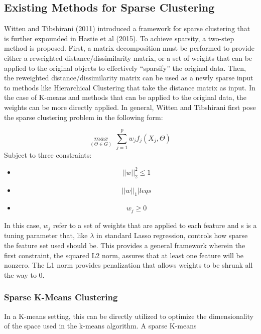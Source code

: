 \documentclass[
]{article}
\providecommand{\tightlist}{%
  \setlength{\itemsep}{0pt}\setlength{\parskip}{0pt}}
\begin{document}
\hypertarget{existing-methods-for-sparse-clustering}{%
\subsection{Existing Methods for Sparse
Clustering}\label{existing-methods-for-sparse-clustering}}

Witten and Tibshirani (2011) introduced a framework for sparse
clustering that is further expounded in Hastie et al (2015). To achieve
sparsity, a two-step method is proposed. First, a matrix decomposition
must be performed to provide either a reweighted distance/dissimilarity
matrix, or a set of weights that can be applied to the original objects
to effectively ``sparsify'' the original data. Then, the reweighted
distance/dissimilarity matrix can be used as a newly sparse input to
methods like Hierarchical Clustering that take the distance matrix as
input. In the case of K-means and methods that can be applied to the
original data, the weights can be more directly applied. In general,
Witten and Tibshirani first pose the sparse clustering problem in the
following form:

\[\underset{(\Theta \in G)}{max} ~ ~ {\sum_{j=1}^{p}w_j f_j(X_j, \Theta)} \]
Subject to three constraints:

\begin{itemize}
\tightlist
\item
  \[ ||w||_2^2 \leq 1 \]
\item
  \[ ||w||_1 |leq s\]
\item
  \[ w_j \geq 0\]
\end{itemize}

In this case, \(w_j\) refer to a set of weights that are applied to each
feature and s is a tuning parameter that, like \(\lambda\) in standard
Lasso regression, controls how sparse the feature set used should be.
This provides a general framework wherein the first constraint, the
squared L2 norm, assures that at least one feature will be nonzero. The
L1 norm provides penalization that allows weights to be shrunk all the
way to 0.

\hypertarget{sparse-k-means-clustering}{%
\subsubsection{Sparse K-Means
Clustering}\label{sparse-k-means-clustering}}

In a K-means setting, this can be directly utilized to optimize the
dimensionality of the space used in the k-means algorithm. A sparse
K-means
\end{document}
